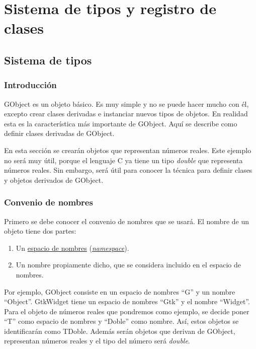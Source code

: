 %

\section{Sistema de tipos y registro de clases}
\subsection{Sistema de tipos} \label{subsec:sistematipos}
\subsubsection{Introducción}
\textsf{GObject} es un objeto básico. Es muy simple y no se puede hacer mucho con él, excepto crear
clases derivadas e instanciar nuevos tipos de objetos.
En realidad esta es la característica más importante de \textsf{GObject}.
Aquí se describe como definir clases derivadas de \textsf{GObject}.

En esta sección se crearán objetos que representan números reales. Este ejemplo no será muy útil, porque
el lenguaje C ya tiene un tipo \emph{double} que representa números reales. Sin embargo, será útil para
conocer la técnica para definir clases y objetos derivados de \textsf{GObject}.

\subsubsection{Convenio de nombres}
Primero se debe conocer el convenio de nombres que se usará. El nombre de un objeto tiene dos partes:
\begin{enumerate}
  \tightlist
\item Un \href{https://es.wikipedia.org/wiki/Espacio_de_nombres}{espacio de nombres}
  (\href{https://en.wikipedia.org/wiki/Namespace}{\textit{namespace}}).
\item Un nombre propiamente dicho, que se considera incluido en el espacio de nombres.
\end{enumerate}

Por ejemplo, \textsf{GObject} consiste en un espacio de nombres ``\textsf{G}'' y un nombre ``\textsf{Object}''.
\textsf{GtkWidget} tiene un espacio de nombres ``\textsf{Gtk}'' y el nombre ``\textsf{Widget}''.
Para el objeto de números reales que pondremos como ejemplo, se decide poner ``\textsf{T}'' como espacio
de nombres y ``\textsf{Doble}'' como nombre. Así, estos objetos se identificarán como \textsf{TDoble}.
Además serán objetos que derivan de \textsf{GObject}, representan números reales y el tipo del número
será \textit{double}.

